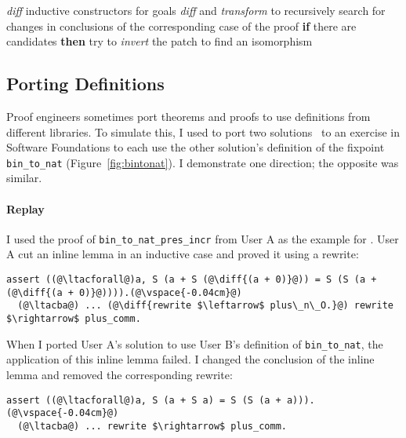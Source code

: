 \begin{algorithm}
\footnotesize
\begin{algorithmic}[1]
    \STATE \textit{diff} inductive constructors for goals
    \STATE \textit{diff} and \textit{transform} to recursively search for changes in conclusions of the corresponding case of the proof
    \STATE \textbf{if} there are candidates \textbf{then}
    \STATE \hspace*{1em} try to \textit{invert} the patch to find an isomorphism 
\end{algorithmic}
\end{algorithm}

\subsection{Porting Definitions}
\label{sec:foundations}

Proof engineers sometimes port theorems and proofs to use definitions from different libraries.
To simulate this, I used \sysname to port two solutions~\cite{usera, userb}
to an exercise in Software Foundations to each use the other solution's definition of the fixpoint \lstinline{bin_to_nat} (Figure~\ref{fig:bintonat}).
I demonstrate one direction; the opposite was similar.

\paragraph{Replay} I used the proof of \lstinline{bin_to_nat_pres_incr} from User A as the example for \sysname.
User A cut an inline lemma in an inductive case and proved it using a rewrite:

\begin{lstlisting}[language=coq]
  assert ((@\ltacforall@)a, S (a + S (@\diff{(a + 0)}@)) = S (S (a + (@\diff{(a + 0)}@)))).(@\vspace{-0.04cm}@)
  (@\ltacba@) ... (@\diff{rewrite $\leftarrow$ plus\_n\_O.}@) rewrite $\rightarrow$ plus_comm.
\end{lstlisting} %
When I ported User A's solution to use User B's definition of \lstinline{bin_to_nat}, 
the application of this inline lemma failed. I changed the conclusion of the inline lemma 
and removed the corresponding rewrite:

\begin{lstlisting}[language=coq]
  assert ((@\ltacforall@)a, S (a + S a) = S (S (a + a))).(@\vspace{-0.04cm}@)
  (@\ltacba@) ... rewrite $\rightarrow$ plus_comm.
\end{lstlisting} %

